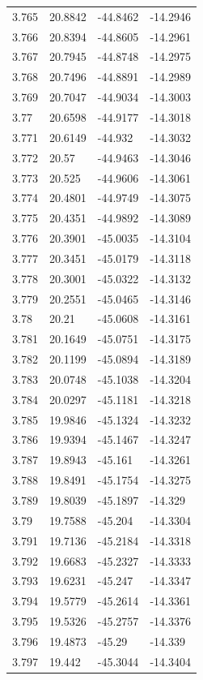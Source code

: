 \begin{tabular}{llll}
3.765 & 20.8842 & -44.8462 & -14.2946 \\
3.766 & 20.8394 & -44.8605 & -14.2961 \\
3.767 & 20.7945 & -44.8748 & -14.2975 \\
3.768 & 20.7496 & -44.8891 & -14.2989 \\
3.769 & 20.7047 & -44.9034 & -14.3003 \\
3.77 & 20.6598 & -44.9177 & -14.3018 \\
3.771 & 20.6149 & -44.932 & -14.3032 \\
3.772 & 20.57 & -44.9463 & -14.3046 \\
3.773 & 20.525 & -44.9606 & -14.3061 \\
3.774 & 20.4801 & -44.9749 & -14.3075 \\
3.775 & 20.4351 & -44.9892 & -14.3089 \\
3.776 & 20.3901 & -45.0035 & -14.3104 \\
3.777 & 20.3451 & -45.0179 & -14.3118 \\
3.778 & 20.3001 & -45.0322 & -14.3132 \\
3.779 & 20.2551 & -45.0465 & -14.3146 \\
3.78 & 20.21 & -45.0608 & -14.3161 \\
3.781 & 20.1649 & -45.0751 & -14.3175 \\
3.782 & 20.1199 & -45.0894 & -14.3189 \\
3.783 & 20.0748 & -45.1038 & -14.3204 \\
3.784 & 20.0297 & -45.1181 & -14.3218 \\
3.785 & 19.9846 & -45.1324 & -14.3232 \\
3.786 & 19.9394 & -45.1467 & -14.3247 \\
3.787 & 19.8943 & -45.161 & -14.3261 \\
3.788 & 19.8491 & -45.1754 & -14.3275 \\
3.789 & 19.8039 & -45.1897 & -14.329 \\
3.79 & 19.7588 & -45.204 & -14.3304 \\
3.791 & 19.7136 & -45.2184 & -14.3318 \\
3.792 & 19.6683 & -45.2327 & -14.3333 \\
3.793 & 19.6231 & -45.247 & -14.3347 \\
3.794 & 19.5779 & -45.2614 & -14.3361 \\
3.795 & 19.5326 & -45.2757 & -14.3376 \\
3.796 & 19.4873 & -45.29 & -14.339 \\
3.797 & 19.442 & -45.3044 & -14.3404 \\

\end{tabular}
